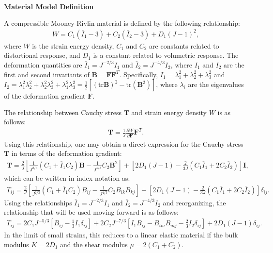 \textbf{Material Model Definition}

A compressible Mooney-Rivlin material is defined by the following relationship:
\begin{align}
W = C_1(\overline{I}_1 - 3) + C_2(\overline{I}_2 - 3) + D_1(J - 1)^2,
\end{align}
where $W$ is the strain energy density, $C_1$ and $C_2$ are constants related to distortional response, and $D_1$ is a constant related to volumetric response. The deformation quantities are $\overline{I}_1 = J^{-2/3}I_1$ and $\overline{I}_2 = J^{-4/3}I_2$, where $I_1$ and $I_2$ are the first and second invariants of $\bm{B} = {\bm F}{\bm F}^T$. Specifically, $I_1 = \lambda_1^2 + \lambda_2^2 + \lambda_3^2$ and $I_2 = \lambda_1^2\lambda_2^2 + \lambda_2^2\lambda_3^2 + \lambda_1^2\lambda_3^2 = \frac{1}{2}[(\text{tr}{\bm B})^2 - \text{tr}({\bm B}^2)]$, where $\lambda_i$ are the eigenvalues of the deformation gradient ${\bm F}$.

The relationship between Cauchy stress ${\bm T}$ and strain energy density $W$ is as follows:
\begin{align}
{\bm T} = \frac{1}{J}\frac{\partial W}{\partial {\bm F}}{\bm F}^{T}.
\end{align}
Using this relationship, one may obtain a direct expression for the Cauchy stress ${\bm T}$ in terms of the deformation gradient:
\begin{align}
{\bm T} = \frac{2}{J}\left[\frac{1}{J^{2/3}}(C_1 + \overline{I}_1{C_2}){\bm B} - \frac{1}{J^{4/3}}C_2{\bm B}^2\right] + \left[2D_1(J-1) - \frac{2}{3J}(C_1\overline{I}_1 + 2C_2\overline{I}_2)\right]{\bm I},
\end{align}
which can be written in index notation as:
\begin{align}
T_{ij} = \frac{2}{J}\left[\frac{1}{J^{2/3}}(C_1 + \overline{I}_{1}C_2)B_{ij} - \frac{1}{J^{4/3}}C_2B_{ik}B_{kj}\right] + \left[2D_1(J-1) - \frac{2}{3J}(C_1\overline{I}_{1} + 2C_2\overline{I}_{2})\right]\delta_{ij}.
\end{align}
Using the relationships $\overline{I}_{1} = J^{-2/3}I_1$ and $\overline{I}_{2} = J^{-4/3}I_2$ and reorganizing, the relationship that will be used moving forward is as follows:
\begin{align}
\label{eqn:stress}
T_{ij} = 2C_1J^{-5/3}\left[B_{ij} - \frac{1}{3}I_1\delta_{ij}\right] + 2C_2J^{-7/3}\left[I_1B_{ij} - B_{im}B_{mj} - \frac{2}{3}I_2\delta_{ij}\right] + 2D_1(J-1)\delta_{ij}.
\end{align}
In the limit of small strains, this reduces to a linear elastic material if the bulk modulus $K = 2D_1$ and the shear modulus $\mu = 2(C_1 + C_2)$.

